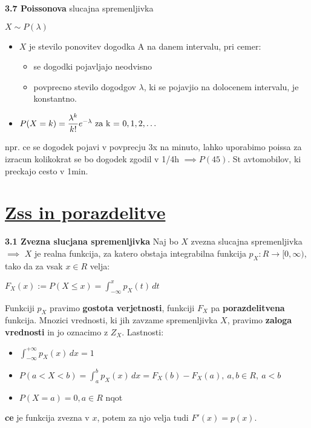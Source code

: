 \documentclass{article}
\begin{document}
\begin{multicols}{3}
	\textbf{3.7 Poissonova} slucajna spremenljivka
	\begin{center}
		\begin{math}
			X \sim P(\lambda)
		\end{math}
	\end{center}
	\begin{itemize}
		\item $X$ je stevilo ponovitev dogodka A na danem intervalu, pri cemer:
		      \begin{itemize}
			      \item se dogodki pojavljajo neodvisno
			      \item povprecno stevilo dogodgov $\lambda$, ki se pojavjio na dolocenem intervalu, je konstantno.
		      \end{itemize}
		\item \begin{math}
			      P(X = k) =  \dfrac{ \lambda^{k} }{k!} e^{- \lambda}$ za k = $ 0,1,2,\dots
		      \end{math}
	\end{itemize}
	npr. ce se dogodek pojavi v povprecju 3x na minuto, lahko uporabimo poissa za izracun
	kolikokrat se bo dogodek zgodil v  1/4h $\implies P(45)$. St avtomobilov, ki preckajo cesto v 1min.

	\section{\underline{Zss in porazdelitve}}

	\textbf{3.1 Zvezna slucjana spremenljivka}
	Naj bo $X$ zvezna slucajna spremenljivka $\implies$ $X$ je realna funkcija,
	za katero obstaja integrabilna funkcija $p_{X}: R \rightarrow [0, \infty)$,
	tako da za vsak $x \in R$ velja:

	\begin{center}
		\begin{math}
			F_{X}(x) := P(X \leq x) = \int_{- \infty}^{x} p_{X}(t) \,dt
		\end{math}
	\end{center}

	Funkciji $p_{X}$ pravimo \textbf{gostota verjetnosti}, funkciji $F_{X}$ pa
	\textbf{porazdelitvena} funkcija. Mnozici vrednosti, ki jih zavzame spremenljivka
	$X$, pravimo \textbf{zaloga vrednosti} in jo oznacimo z $Z_{X}$.
	Lastnosti:
	\begin{itemize}
		\item \begin{math}
			      \int_{- \infty}^{+ \infty} p_{X}(x) \,dx = 1
		      \end{math}
		\item \begin{math}
			      P(a < X < b) = \int_{a}^{b} p_{X}(x) \,dx = F_{X}(b) - F_{X}(a),\: a,b \in R,\: a < b
		      \end{math}
		\item \begin{math}
			      P(X = a) = 0, a \in R
		      \end{math} nqot
	\end{itemize}
	\textbf{ce} je funkcija zvezna v $x$, potem za njo velja tudi $F'(x) = p(x)$.


\end{multicols}
\end{document}
